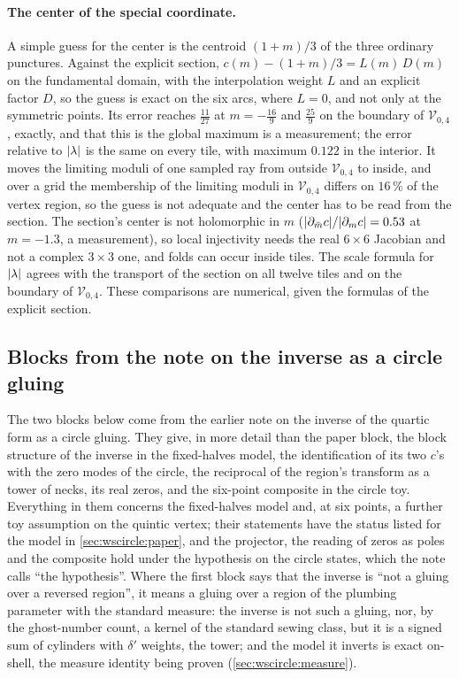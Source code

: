 \paragraph{The center of the special coordinate.}
A simple guess for the center is the centroid $(1 + m) / 3$ of the three ordinary punctures.
Against the explicit section, $c(m) - (1 + m) / 3 = L(m) \, D(m)$ on the fundamental domain, with the interpolation weight $L$ and an explicit factor $D$, so the guess is exact on the six arcs, where $L = 0$, and not only at the symmetric points.
Its error reaches $\tfrac{11}{27}$ at $m = - \tfrac{16}{9}$ and $\tfrac{25}{9}$ on the boundary of $\mathcal V_{0,4}$, exactly, and that this is the global maximum is a measurement; the error relative to ${|\lambda|}$ is the same on every tile, with maximum $0.122$ in the interior.
It moves the limiting moduli of one sampled ray from outside $\mathcal V_{0,4}$ to inside, and over a grid the membership of the limiting moduli in $\mathcal V_{0,4}$ differs on $16 \, \%$ of the vertex region, so the guess is not adequate and the center has to be read from the section.
The section's center is not holomorphic in $m$ (${|\partial_{\bar m} c|} / {|\partial_m c|} = 0.53$ at $m = - 1.3$, a measurement), so local injectivity needs the real $6 \times 6$ Jacobian and not a complex $3 \times 3$ one, and folds can occur inside tiles.
The scale formula for ${|\lambda|}$ agrees with the transport of the section on all twelve tiles and on the boundary of $\mathcal V_{0,4}$.
These comparisons are numerical, given the formulas of the explicit section.

\subsection{Blocks from the note on the inverse as a circle gluing}
\label{sec:wscircle:note}


The two blocks below come from the earlier note on the inverse of the quartic form as a circle gluing.
They give, in more detail than the paper block, the block structure of the inverse in the fixed-halves model, the identification of its two $c$'s with the zero modes of the circle, the reciprocal of the region's transform as a tower of necks, its real zeros, and the six-point composite in the circle toy.
Everything in them concerns the fixed-halves model and, at six points, a further toy assumption on the quintic vertex; their statements have the status listed for the model in \cref{sec:wscircle:paper}, and the projector, the reading of zeros as poles and the composite hold under the hypothesis on the circle states, which the note calls ``the hypothesis''.
Where the first block says that the inverse is ``not a gluing over a reversed region'', it means a gluing over a region of the plumbing parameter with the standard measure: the inverse is not such a gluing, nor, by the ghost-number count, a kernel of the standard sewing class, but it is a signed sum of cylinders with $\delta'$ weights, the tower; and the model it inverts is exact on-shell, the measure identity being proven (\cref{sec:wscircle:measure}).

